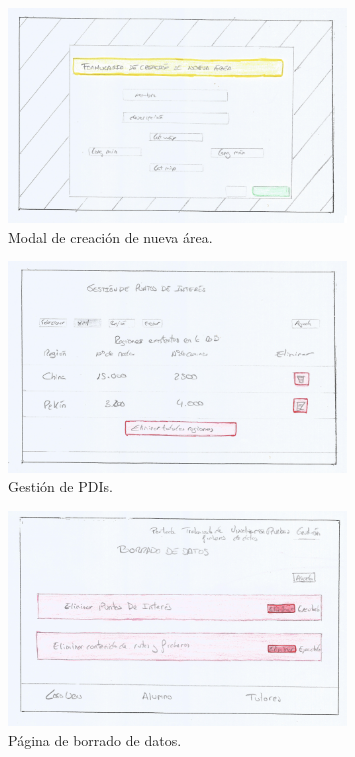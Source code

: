 \begin{figure}[!htbp]
  \centering
    \includegraphics[width=0.8\textwidth]{../img/prototipado/alta/nuevaarea.png}
  \caption{Modal de creación de nueva área.}
  \label{nuevaarea}
\end{figure}

\begin{figure}[!htbp]
  \centering
    \includegraphics[width=0.8\textwidth]{../img/prototipado/alta/pdis.png}
  \caption{Gestión de PDIs.}
  \label{pdis}
\end{figure}

\begin{figure}[!htbp]
  \centering
    \includegraphics[width=0.8\textwidth]{../img/prototipado/alta/borrado.png}
  \caption{Página de borrado de datos.}
  \label{borrado}
\end{figure}
